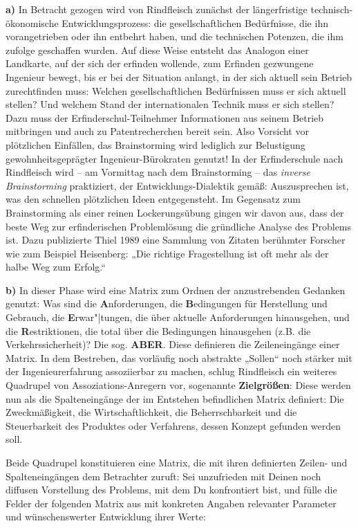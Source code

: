 \documentclass[12pt,a4paper]{article}
\begin{document}
\textbf{a)} 
In Betracht gezogen wird von Rindfleisch zunächst der längerfristige
technisch-ökonomische Entwicklungsprozess: die gesellschaftlichen Bedürfnisse,
die ihn vorangetrieben oder ihn entbehrt haben, und die technischen Potenzen,
die ihm zufolge geschaffen wurden. Auf diese Weise entsteht das Analogon einer
Landkarte, auf der sich der erfinden wollende, zum Erfinden gezwungene
Ingenieur bewegt, bis er bei der Situation anlangt, in der sich aktuell sein
Betrieb zurechtfinden muss: Welchen gesellschaftlichen Bedürfnissen muss er
sich aktuell stellen? Und welchem Stand der internationalen Technik muss er
sich stellen? Dazu muss der Erfinderschul-Teilnehmer Informationen aus seinem
Betrieb mitbringen und auch zu Patentrecherchen bereit sein. Also Vorsicht vor
plötzlichen Einfällen, das Brainstorming wird lediglich zur Belustigung
gewohnheitsgeprägter Ingenieur-Bürokraten genutzt! In der Erfinderschule nach
Rindfleisch wird – am Vormittag nach dem Brainstorming – das \emph{inverse
  Brainstorming} praktiziert, der Entwicklungs-Dialektik gemäß: Auszusprechen
ist, was den schnellen plötzlichen Ideen entgegensteht. Im Gegensatz zum
Brainstorming als einer reinen Lockerungsübung gingen wir davon aus, dass der
beste Weg zur erfinderischen Problemlösung die gründliche Analyse des Problems
ist. Dazu publizierte Thiel 1989 eine Sammlung von Zitaten berühmter Forscher
wie zum Beispiel Heisenberg: „Die richtige Fragestellung ist oft mehr als der
halbe Weg zum Erfolg.“

\textbf{b)} 
In dieser Phase wird eine Matrix zum Ordnen der anzustrebenden Gedanken
genutzt: Was sind die \textbf{A}nforderungen, die \textbf{B}edingungen für
Herstellung und Gebrauch, die \textbf{E}rwar"|tungen, die über aktuelle
Anforderungen hinausgehen, und die \textbf{R}estriktionen, die total über die
Bedingungen hinausgehen (z.B. die Verkehrssicherheit)? Die sog. \textbf{ABER}.
Diese definieren die Zeileneingänge einer Matrix. In dem Bestreben, das
vorläufig noch abstrakte „Sollen“ noch stärker mit der Ingenieurerfahrung
assoziierbar zu machen, schlug Rindfleisch ein weiteres Quadrupel von
Assoziations-Anregern vor, sogenannte \textbf{Zielgrößen}: Diese werden nun als
die Spalteneingänge der im Entstehen befindlichen Matrix definiert: Die
Zweckmäßigkeit, die Wirtschaftlichkeit, die Beherrschbarkeit und die
Steuerbarkeit des Produktes oder Verfahrens, dessen Konzept gefunden werden
soll.

Beide Quadrupel konstituieren eine Matrix, die mit ihren definierten Zeilen-
und Spalteneingängen dem Betrachter zuruft: Sei unzufrieden mit Deinen noch
diffusen Vorstellung des Problems, mit dem Du konfrontiert bist, und fülle die
Felder der folgenden Matrix aus mit konkreten Angaben relevanter Parameter und
wünschenswerter Entwicklung ihrer Werte:
\end{document}
